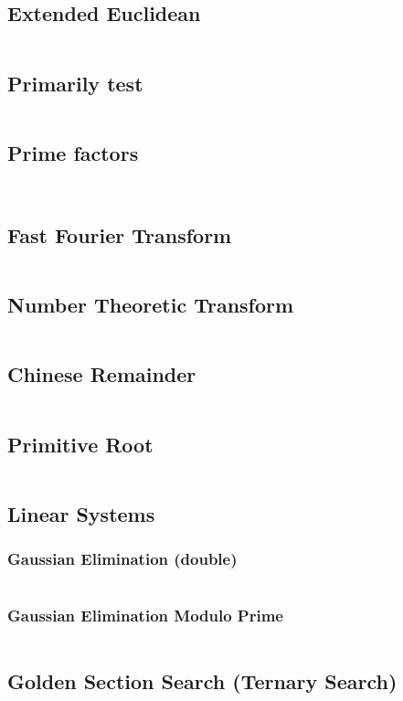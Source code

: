 \documentclass[a4paper, 10pt, twocolumn, landscape]{article}
\begin{document}
  \subsection{Extended Euclidean}
  \inputminted{cpp}{math/extended-euclid.cpp}
  \subsection{Primarily test}
  \inputminted{cpp}{math/miller-rabin.cpp}
  \subsection{Prime factors}
  \inputminted{cpp}{math/prime-factors.cpp}
  \inputminted{cpp}{math/pollard-rho.cpp}
  \subsection{Fast Fourier Transform}
  \inputminted{cpp}{math/fft.cpp}
  \subsection{Number Theoretic Transform}
  \inputminted{cpp}{math/ntt.cpp}
  \subsection{Chinese Remainder}
  \inputminted{cpp}{math/chinese.cpp}
  \subsection{Primitive Root}
  \inputminted{cpp}{math/primitive-root.cpp}
  \subsection{Linear Systems}
  \subsubsection{Gaussian Elimination (double)}
  \inputminted{cpp}{math/gauss-elim.cpp}
  \subsubsection{Gaussian Elimination Modulo Prime}
  \inputminted{cpp}{math/gauss-elim-prime.cpp}
  \subsection{Golden Section Search (Ternary Search)}
  \inputminted{cpp}{math/gss.cpp}
\end{document}

